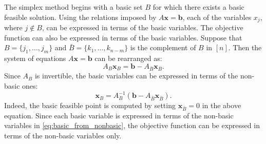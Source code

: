 \documentclass{amsbook}
\newcommand{\xx}{\mathbf x}
\newcommand{\bb}{\mathbf b}
\theoremstyle{definition}
\theoremstyle{remark}
\begin{document}
The simplex method begins with a basic set $B$ for which there exists a basic feasible solution.
Using the relations imposed by $A\xx=\bb$, each of the variables $x_j$, where $j\notin B$, can be expressed in terms of the basic variables.
The objective function can also be expressed in terms of the basic variables.
Suppose that $B=\{j_1,\dotsc,j_m\}$ and $\bar B=\{k_1,\dotsc,k_{n-m}\}$ is the complement of $B$ in $[n]$.
Then the system of equations $A\xx=\bb$ can be rearranged as:
\begin{equation}
  \label{eq:basic_from_nonbasic}
  A_B\xx_B = \bb-A_{\bar B}\xx_{\bar B}.
\end{equation}
Since $A_B$ is invertible, the basic variables can be expressed in terms of the non-basic ones:
\begin{displaymath}
  \xx_B = A_B^{-1}(\bb-A_{\bar B}\xx_{\bar B}).
\end{displaymath}
Indeed, the basic feasible point is computed by setting $\xx_{\bar B}=0$ in the above equation.
Since each basic variable is expressed in terms of the non-basic variables in \eqref{eq:basic_from_nonbasic}, the objective function can be expressed in terms of the non-basic variables only.
\end{document}
